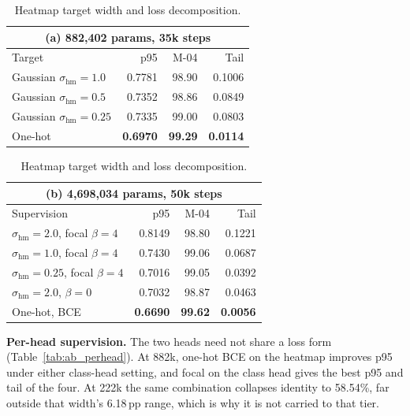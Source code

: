 \documentclass[10pt,twocolumn,letterpaper]{article}
\begin{document}
\begin{table}[h]
\centering\small
\begin{minipage}{0.46\textwidth}\centering
\begin{tabular}{lrrr}
\multicolumn{4}{c}{(a) 882,402 params, 35k steps}\\
\toprule
Target & p95 & M-04 & Tail \\
\midrule
Gaussian $\sigma_{\mathrm{hm}}{=}1.0$ & 0.7781 & 98.90 & 0.1006 \\
Gaussian $\sigma_{\mathrm{hm}}{=}0.5$ & 0.7352 & 98.86 & 0.0849 \\
Gaussian $\sigma_{\mathrm{hm}}{=}0.25$ & 0.7335 & 99.00 & 0.0803 \\
One-hot & \textbf{0.6970} & \textbf{99.29} & \textbf{0.0114} \\
\bottomrule
\end{tabular}
\end{minipage}\hfill
\begin{minipage}{0.52\textwidth}\centering
\begin{tabular}{lrrr}
\multicolumn{4}{c}{(b) 4,698,034 params, 50k steps}\\
\toprule
Supervision & p95 & M-04 & Tail \\
\midrule
$\sigma_{\mathrm{hm}}{=}2.0$, focal $\beta{=}4$ & 0.8149 & 98.80 & 0.1221 \\
$\sigma_{\mathrm{hm}}{=}1.0$, focal $\beta{=}4$ & 0.7430 & 99.06 & 0.0687 \\
$\sigma_{\mathrm{hm}}{=}0.25$, focal $\beta{=}4$ & 0.7016 & 99.05 & 0.0392 \\
$\sigma_{\mathrm{hm}}{=}2.0$, $\beta{=}0$ & 0.7032 & 98.87 & 0.0463 \\
One-hot, BCE & \textbf{0.6690} & \textbf{99.62} & \textbf{0.0056} \\
\bottomrule
\end{tabular}
\end{minipage}
\caption{Heatmap target width and loss decomposition.}
\label{tab:ab_hm}
\end{table}

\textbf{Per-head supervision.} The two heads need not share a loss form
(Table~\ref{tab:ab_perhead}). At 882k, one-hot BCE on the heatmap improves p95 under either
class-head setting, and focal on the class head gives the best p95 and tail of the four. At 222k the
same combination collapses identity to 58.54\%, far outside that width's 6.18\,pp range, which is
why it is not carried to that tier.
\end{document}
